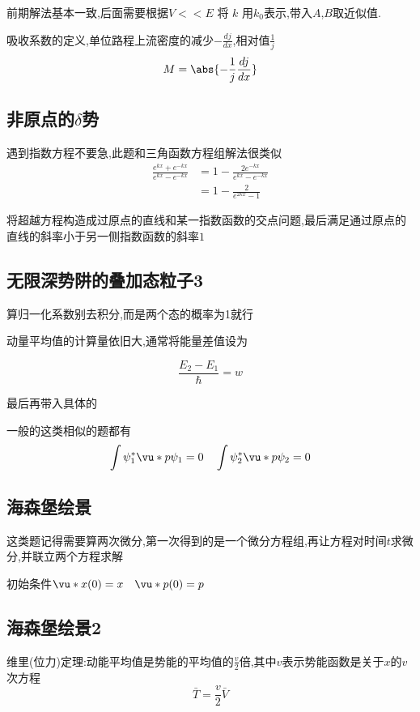             前期解法基本一致,后面需要根据$ V << E$ 将 $ k $ 用$ k_{0} $表示,带入$A$,$B$取近似值.

            吸收系数的定义,单位路程上流密度的减少$ -\frac{dj}{dx} $,相对值$ \frac{1}{j} $
            $$ M = \abs{ - \frac{1}{j} \frac{dj}{dx}} $$

        \subsection{非原点的\texorpdfstring{$\delta$}{}势}

            遇到指数方程不要急,此题和三角函数方程组解法很类似
            \begin{align*}
                \frac{e^{kx} + e^{-kx}}{e^{kx} - e^{-kx}} &= 1 - \frac{2e^{-kx}}{e^{kx} - e^{-kx}} \\
                                                          &= 1 - \frac{2}{e^{2kx} - 1}
            \end{align*}
            
            将超越方程构造成过原点的直线和某一指数函数的交点问题,最后满足通过原点的直线的斜率小于另一侧指数函数的斜率$1$

        \subsection{无限深势阱的叠加态粒子3}
            算归一化系数别去积分,而是两个态的概率为1就行

            动量平均值的计算量依旧大,通常将能量差值设为

            $$ \frac{E_{2} - E_{1}}{\hbar} = w $$    
        
            最后再带入具体的

            一般的这类相似的题都有
            $$ \int \psi_{1}^{*} \vu*{p} \psi_{1} = 0 \quad \int \psi_{2}^{*} \vu*{p} \psi_{2} = 0 $$

        \subsection{海森堡绘景}
            这类题记得需要算两次微分,第一次得到的是一个微分方程组,再让方程对时间$t$求微分,并联立两个方程求解
        
            初始条件$ \vu*{x}(0) = x \quad \vu*{p}(0) = p $

        \subsection{海森堡绘景2}
            \begin{thm}\label{thm:1.3}
                \thmindent

                维里(位力)定理:动能平均值是势能的平均值的$\frac{v}{2}$倍,其中$v$表示势能函数是关于$x$的$v$次方程
                $$ \bar{T} = \frac{v}{2} \bar{V} $$ 

            \end{thm}

